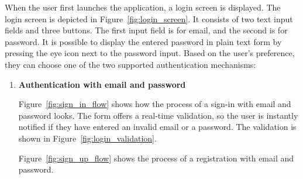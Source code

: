 \documentclass[
  digital, %
  table,   %
  oneside, %
  lof,     %
  lot,     %
]{fithesis3}
\begin{document}
When the user first launches the application, a login screen is displayed. The login screen is depicted in Figure~\ref{fig:login_screen}. It consists of two text input fields and three buttons. The first input field is for email, and the second is for password. It is possible to display the entered password in plain text form by pressing the eye icon next to the password input. Based on the user's preference, they can choose one of the two supported authentication mechanisms:

\begin{enumerate}
    \item \textbf{Authentication with email and password}
    
    Figure~\ref{fig:sign_in_flow} shows how the process of a sign-in with email and password looks. The form offers a real-time validation, so the user is instantly notified if they have entered an invalid email or a password. The validation is shown in Figure~\ref{fig:login_validation}.
        
    Figure~\ref{fig:sign_up_flow} shows the process of a registration with email and password.
    

\end{enumerate}
\end{document}
